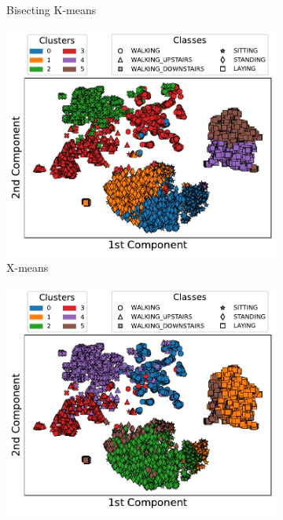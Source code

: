 \documentclass[10pt, a4paper, twocolumn]{article}
\begin{document}
\begin{figure}[t]
\begin{subfigure}[t]{0.196\textwidth}
        \caption{Bisecting K-means}
        \label{fig:bisecting_scatter}
    \end{subfigure}
    \begin{subfigure}[t]{0.196\textwidth}
        \includegraphics[width=\linewidth]{immagini simone/xmeans_scatter.pdf}
        \caption{X-means}
        \label{fig:xmeans_scatter}
    \end{subfigure}  
    \begin{subfigure}[t]{0.196\textwidth}
        \includegraphics[width=\linewidth]{immagini simone/gausmix_scatter.pdf}

\end{subfigure}
\end{figure}
\end{document}
